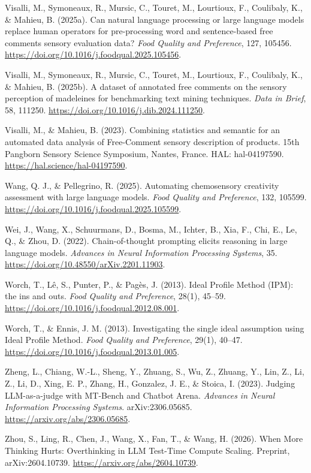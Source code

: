 \documentclass[11pt]{article}
\begin{document}
\noindent Visalli, M., Symoneaux, R., Mursic, C., Touret, M., Lourtioux, F.,
Coulibaly, K., \& Mahieu, B. (2025a). Can natural language processing or large
language models replace human operators for pre-processing word and
sentence-based free comments sensory evaluation data? \emph{Food Quality and
Preference}, 127, 105456. \url{https://doi.org/10.1016/j.foodqual.2025.105456}.

\noindent Visalli, M., Symoneaux, R., Mursic, C., Touret, M., Lourtioux, F.,
Coulibaly, K., \& Mahieu, B. (2025b). A dataset of annotated free comments on the
sensory perception of madeleines for benchmarking text mining techniques.
\emph{Data in Brief}, 58, 111250.
\url{https://doi.org/10.1016/j.dib.2024.111250}.

\noindent Visalli, M., \& Mahieu, B. (2023). Combining statistics and semantic
for an automated data analysis of Free-Comment sensory description of products.
15th Pangborn Sensory Science Symposium, Nantes, France. HAL: hal-04197590.
\url{https://hal.science/hal-04197590}.

\noindent Wang, Q. J., \& Pellegrino, R. (2025). Automating chemosensory
creativity assessment with large language models. \emph{Food Quality and
Preference}, 132, 105599.
\url{https://doi.org/10.1016/j.foodqual.2025.105599}.

\noindent Wei, J., Wang, X., Schuurmans, D., Bosma, M., Ichter, B., Xia, F.,
Chi, E., Le, Q., \& Zhou, D. (2022). Chain-of-thought prompting elicits
reasoning in large language models. \emph{Advances in Neural Information
Processing Systems}, 35. \url{https://doi.org/10.48550/arXiv.2201.11903}.

\noindent Worch, T., L\^e, S., Punter, P., \& Pag\`es, J. (2013). Ideal
Profile Method (IPM): the ins and outs. \emph{Food Quality and Preference},
28(1), 45--59. \url{https://doi.org/10.1016/j.foodqual.2012.08.001}.

\noindent Worch, T., \& Ennis, J. M. (2013). Investigating the single ideal
assumption using Ideal Profile Method. \emph{Food Quality and Preference},
29(1), 40--47. \url{https://doi.org/10.1016/j.foodqual.2013.01.005}.

\noindent Zheng, L., Chiang, W.-L., Sheng, Y., Zhuang, S., Wu, Z., Zhuang, Y.,
Lin, Z., Li, Z., Li, D., Xing, E. P., Zhang, H., Gonzalez, J. E., \& Stoica, I.
(2023). Judging LLM-as-a-judge with MT-Bench and Chatbot Arena. \emph{Advances
in Neural Information Processing Systems}. arXiv:2306.05685.
\url{https://arxiv.org/abs/2306.05685}.

\noindent Zhou, S., Ling, R., Chen, J., Wang, X., Fan, T., \& Wang, H. (2026).
When More Thinking Hurts: Overthinking in LLM Test-Time Compute Scaling.
Preprint, arXiv:2604.10739. \url{https://arxiv.org/abs/2604.10739}.
\end{document}
